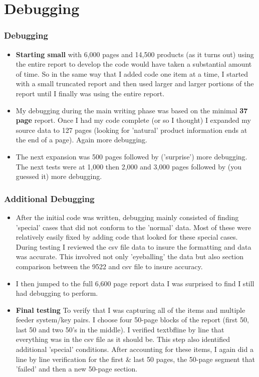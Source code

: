\documentclass{beamer}\usepackage[]{graphicx}\usepackage[]{color}
\begin{document}
\section{Debugging}
\begin{frame}[fragile]
  \frametitle{Debugging}
\begin{itemize}  
\item<1->
\textbf{Starting small} with 6,000 pages and 14,500 products (as it turns out) using the entire report to develop the code would have taken a substantial amount of time.  So in the same way that I added code one item at a time, I started with a small truncated report and then used larger and larger portions of the report until I finally was using the entire report.
\item<2->
My debugging during the main writing phase was based on the minimal \textbf{37 page} report.
Once I had my code complete (or so I thought) I expanded my source data to 127 pages (looking for 'natural' product information ends at the end of a page).  Again more debugging.
\item<3->
The next expansion was 500 pages followed by ('surprise') more debugging.  The next tests were at 1,000 then 2,000 and 3,000 pages followed by (you guessed it) more debugging.

\end{itemize}


\end{frame}

\begin{frame}[fragile]
\frametitle{Additional Debugging}
\begin{itemize}  
\item<1->
After the initial code was written, debugging mainly consisted of finding 'special' cases that did not conform to the 'normal' data.  Most of these were relatively easily fixed by adding code that looked for these special cases.   During testing I reviewed the csv file data to insure the formatting and data was accurate.  This involved not only 'eyeballing' the data but also section comparison between the 9522 and csv file to insure accuracy.
\item<2->
I then jumped to the full 6,600 page report data I was surprised to find I still had debugging to perform.  
\item<3->

\textbf{Final testing} To verify that I was capturing all of the items and multiple feeder system/key pairs.  I choose four 50-page blocks of the report (first 50, last 50 and two 50's in the middle). I verified textbf{line by line} that everything was in the csv file as it should be.  This step also identified additional 'special' conditions.  After accounting for these items, I again did a line by line verification for the first & last 50 pages, the 50-page segment that 'failed' and then a new 50-page section.

\end{itemize}
\end{frame}
\end{document}
